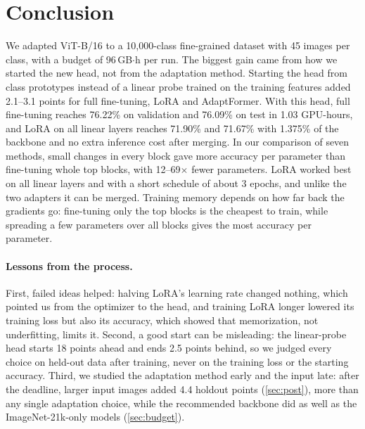 \section{Conclusion}
\label{sec:conclusion}

We adapted ViT-B/16 to a 10,000-class fine-grained dataset with 45 images per class, with a budget of 96\,GB$\cdot$h per run.
The biggest gain came from how we started the new head, not from the adaptation method.
Starting the head from class prototypes instead of a linear probe trained on the training features added 2.1--3.1 points for full fine-tuning, LoRA and AdaptFormer.
With this head, full fine-tuning reaches 76.22\% on validation and 76.09\% on test in 1.03 GPU-hours, and LoRA on all linear layers reaches 71.90\% and 71.67\% with 1.375\% of the backbone and no extra inference cost after merging.
In our comparison of seven methods, small changes in every block gave more accuracy per parameter than fine-tuning whole top blocks, with 12--69$\times$ fewer parameters.
LoRA worked best on all linear layers and with a short schedule of about 3 epochs, and unlike the two adapters it can be merged.
Training memory depends on how far back the gradients go: fine-tuning only the top blocks is the cheapest to train, while spreading a few parameters over all blocks gives the most accuracy per parameter.

\paragraph{Lessons from the process.}
First, failed ideas helped: halving LoRA's learning rate changed nothing, which pointed us from the optimizer to the head, and training LoRA longer lowered its training loss but also its accuracy, which showed that memorization, not underfitting, limits it.
Second, a good start can be misleading: the linear-probe head starts 18 points ahead and ends 2.5 points behind, so we judged every choice on held-out data after training, never on the training loss or the starting accuracy.
Third, we studied the adaptation method early and the input late: after the deadline, larger input images added 4.4 holdout points (\cref{sec:post}), more than any single adaptation choice, while the recommended backbone did as well as the ImageNet-21k-only models (\cref{sec:budget}).

